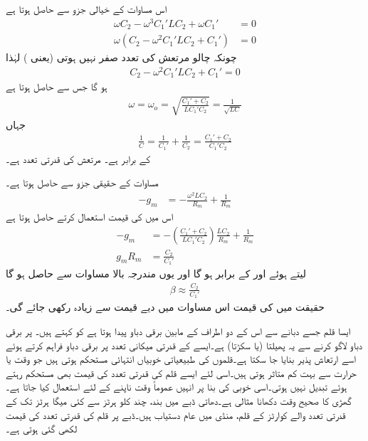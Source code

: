 اس مساوات کے خیالی جزو سے حاصل ہوتا ہے
\begin{align*}
\omega C_2-\omega^3 C_1' L C_2 +\omega C_1' &=0\\
\omega \left(C_2-\omega^2 C_1' L C_2 + C_1'  \right )&=0
\end{align*}
چونکہ چالو مرتعش کی تعدد صفر نہیں ہوتی (یعنی ) لہٰذا
\begin{align*}
C_2-\omega^2 C_1' L C_2 + C_1'=0
\end{align*}
ہو گا جس سے حاصل ہوتا ہے
\begin{align}  \label{مساوات_مرتعش_ٹرانزسٹر_کالپٹس_تعدد}
\omega=\omega_o=\sqrt{\frac{C_1'+C_2}{L C_1' C_2}} =\frac{1}{\sqrt{LC}}
\end{align}
جہاں
\begin{align}
\frac{1}{C}=\frac{1}{C_1'}+\frac{1}{C_2}=\frac{C_1'+C_2}{C_1' C_2} 
\end{align}
کے برابر ہے۔ مرتعش کی قدرتی تعدد ہے۔

مساوات  کے حقیقی جزو سے حاصل ہوتا ہے۔
\begin{align*}
-g_m&=-\frac{\omega^2 L C_2}{R_m}+\frac{1}{R_m}
\end{align*}
اس میں  کی قیمت استعمال کرتے حاصل ہوتا ہے
\begin{align*}
-g_m&=-\left(\frac{C_1'+C_2}{L C_1' C_2} \right)\frac{L C_2}{R_m}+\frac{1}{R_m}\\
g_m R_m&=\frac{C_2}{C_1'}
\end{align*}
 لیتے ہوئے اور  کے برابر ہو گا اور یوں مندرجہ بالا مساوات سے حاصل ہو گا
\begin{align} \label{مساوات_مرتعش_ٹرانزسٹر_افزائش}
\beta \approx \frac{C_2}{C_1'}
\end{align}
حقیقت میں  کی قیمت اس مساوات میں دیے قیمت سے زیادہ رکھی جائے گی۔

ایسا قلم جسے دبانے سے اس کے دو اطراف کے مابین برقی دباو پیدا ہوتا ہے کو  کہتے ہیں۔  پر برقی دباو لاگو کرنے سے یہ پھیلتا (یا سکڑتا) ہے۔ایسے   کے قدرتی میکانی تعدد پر برقی دباو فراہم کرتے ہوئے اسے ارتعاش پذیر بنایا جا سکتا ہے۔قلموں کی طبیعیاتی خوبیاں انتہائی مستحکم ہوتی ہیں جو وقت یا حرارت سے بہت کم متاثر ہوتی ہیں۔اسی لئے ایسے قلم کی قدرتی تعدد کی قیمت بھی مستحکم  رہتے ہوئے تبدیل نہیں ہوتی۔اسی خوبی کی بنا پر انہیں عموماً وقت ناپنے کے لئے استعمال کیا جاتا ہے۔ گھڑی کا صحیح وقت دکھانا مثالی ہے۔دھاتی ڈبے میں بند، چند کلو ہرٹز  سے کئی میگا ہرٹز  تک کے قدرتی تعدد والے کوارٹز کے قلم، منڈی میں عام دستیاب ہیں۔ڈبے پر قلم کی قدرتی تعدد کی قیمت لکھی گئی ہوتی ہے۔
  
